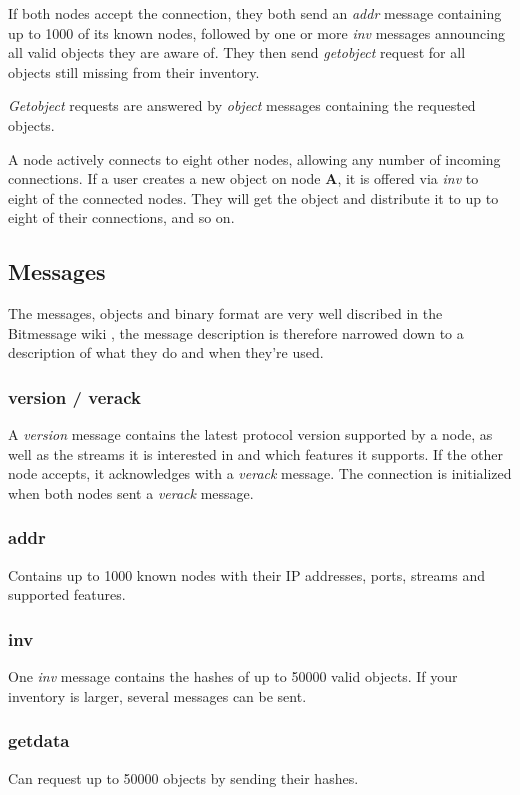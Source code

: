 \documentclass{bfh}
\newcommand{\msg}[1]{\textit{#1}}
\newcommand{\node}[1]{\textbf{#1}}
\begin{document}
  If both nodes accept the connection, they both send an \msg{addr} message containing up to 1000 of its known nodes, followed by one or more \msg{inv} messages announcing all valid objects they are aware of. They then send \msg{getobject} request for all objects still missing from their inventory.

  \msg{Getobject} requests are answered by \msg{object} messages containing the requested objects.

  A node actively connects to eight other nodes, allowing any number of incoming connections. If a user creates a new object on node \node{A}, it is offered via \msg{inv} to eight of the connected nodes. They will get the object and distribute it to up to eight of their connections, and so on.

  \subsection{Messages}

  The messages, objects and binary format are very well discribed in the Bitmessage wiki \cite{wiki:protocol}, the message description is therefore narrowed down to a description of what they do and when they're used.

  \subsubsection{version / verack}
  A \msg{version} message contains the latest protocol version supported by a node, as well as the streams it is interested in and which features it supports. If the other node accepts, it acknowledges with a \msg{verack} message. The connection is initialized when both nodes sent a \msg{verack} message.

  \subsubsection{addr}
  Contains up to 1000 known nodes with their IP addresses, ports, streams and supported features.

  \subsubsection{inv}
  One \msg{inv} message contains the hashes of up to 50000 valid objects. If your inventory is larger, several messages can be sent.

  \subsubsection{getdata}
  Can request up to 50000 objects by sending their hashes.
\end{document}
